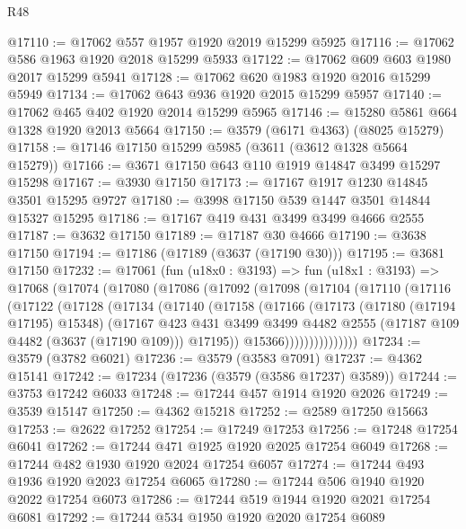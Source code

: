 \begin{lexlean}{R48}
\begin{coremodule}
@17110 := @17062 @557 @1957 @1920 @2019 @15299 @5925
@17116 := @17062 @586 @1963 @1920 @2018 @15299 @5933
@17122 := @17062 @609 @603 @1980 @2017 @15299 @5941
@17128 := @17062 @620 @1983 @1920 @2016 @15299 @5949
@17134 := @17062 @643 @936 @1920 @2015 @15299 @5957
@17140 := @17062 @465 @402 @1920 @2014 @15299 @5965
@17146 := @15280 @5861 @664 @1328 @1920 @2013 @5664
@17150 := @3579 (@6171 @4363) (@8025 @15279)
@17158 := @17146 @17150 @15299 @5985 (@3611 (@3612 @1328 @5664 @15279))
@17166 := @3671 @17150 @643 @110 @1919 @14847 @3499 @15297 @15298
@17167 := @3930 @17150
@17173 := @17167 @1917 @1230 @14845 @3501 @15295 @9727
@17180 := @3998 @17150 @539 @1447 @3501 @14844 @15327 @15295
@17186 := @17167 @419 @431 @3499 @3499 @4666 @2555
@17187 := @3632 @17150
@17189 := @17187 @30 @4666
@17190 := @3638 @17150
@17194 := @17186 (@17189 (@3637 (@17190 @30)))
@17195 := @3681 @17150
@17232 := @17061
    (fun (u18x0 : @3193) =>
    fun (u18x1 : @3193) =>
    @17068
      (@17074
        (@17080
          (@17086
            (@17092
              (@17098
                (@17104
                  (@17110
                    (@17116
                      (@17122
                        (@17128
                          (@17134
                            (@17140
                              (@17158
                                (@17166
                                  (@17173
                                    (@17180 (@17194 @17195) @15348)
                                    (@17167
                                      @423
                                      @431
                                      @3499
                                      @3499
                                      @4482
                                      @2555
                                      (@17187 @109 @4482 (@3637 (@17190 @109)))
                                      @17195))
                                  @15366)))))))))))))))
@17234 := @3579 (@3782 @6021)
@17236 := @3579 (@3583 @7091)
@17237 := @4362 @15141
@17242 := @17234 (@17236 (@3579 (@3586 @17237) @3589))
@17244 := @3753 @17242 @6033
@17248 := @17244 @457 @1914 @1920 @2026
@17249 := @3539 @15147
@17250 := @4362 @15218
@17252 := @2589 @17250 @15663
@17253 := @2622 @17252
@17254 := @17249 @17253
@17256 := @17248 @17254 @6041
@17262 := @17244 @471 @1925 @1920 @2025 @17254 @6049
@17268 := @17244 @482 @1930 @1920 @2024 @17254 @6057
@17274 := @17244 @493 @1936 @1920 @2023 @17254 @6065
@17280 := @17244 @506 @1940 @1920 @2022 @17254 @6073
@17286 := @17244 @519 @1944 @1920 @2021 @17254 @6081
@17292 := @17244 @534 @1950 @1920 @2020 @17254 @6089

\end{coremodule}
\end{lexlean}
